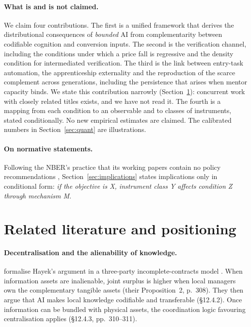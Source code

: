 \documentclass[12pt]{article}
\theoremstyle{remark}
\begin{document}
\paragraph{What is and is not claimed.} We claim four contributions. The first is a unified framework that derives the distributional consequences of \emph{bounded} AI from complementarity between codifiable cognition and conversion inputs. The second is the verification channel, including the conditions under which a price fall is regressive and the density condition for intermediated verification. The third is the link between entry-task automation, the apprenticeship externality and the reproduction of the scarce complement across generations, including the persistence that arises when mentor capacity binds. We state this contribution narrowly (Section~\ref{sec:lit}): concurrent work with closely related titles exists, and we have not read it. The fourth is a mapping from each condition to an observable and to classes of instruments, stated conditionally. No new empirical estimates are claimed. The calibrated numbers in Section~\ref{sec:quant} are illustrations.

\paragraph{On normative statements.} Following the NBER's practice that its working papers contain no policy recommendations \citep[resolution reproduced in][front matter]{agrawal2026volume}, Section~\ref{sec:implications} states implications only in conditional form: \emph{if the objective is X, instrument class Y affects condition Z through mechanism M}.

\section{Related literature and positioning}\label{sec:lit}

\paragraph{Decentralisation and the alienability of knowledge.} \citet{brynjolfsson2026hayek} formalise Hayek's argument \citep{hayek1945use} in a three-party incomplete-contracts model \citep{grossman1986costs,hart1990property}. When information assets are inalienable, joint surplus is higher when local managers own the complementary tangible assets (their Proposition~2, p.~308). They then argue that AI makes local knowledge codifiable and transferable (\S12.4.2). Once information can be bundled with physical assets, the coordination logic favouring centralisation applies (\S12.4.3, pp.~310--311).
\end{document}
